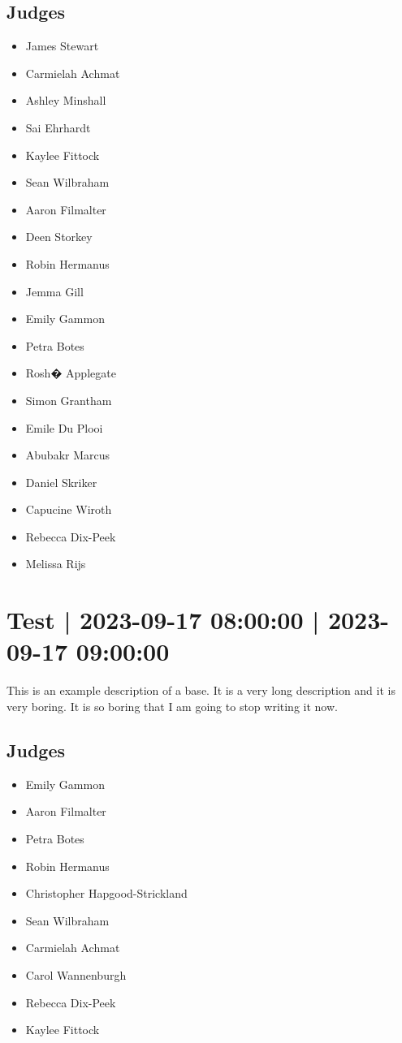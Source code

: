 \documentclass[10pt]{article}
\begin{document}
	\subsection*{Judges}
	\begin{itemize}

			\item James Stewart
			\item Carmielah Achmat
			\item Ashley Minshall
			\item Sai Ehrhardt
			\item Kaylee Fittock
			\item Sean Wilbraham
			\item Aaron Filmalter
			\item Deen Storkey
			\item Robin Hermanus
			\item Jemma Gill
			\item Emily Gammon
			\item Petra Botes
			\item Rosh� Applegate
			\item Simon Grantham
			\item Emile Du Plooi
			\item Abubakr Marcus
			\item Daniel Skriker
			\item Capucine Wiroth
			\item Rebecca Dix-Peek
			\item Melissa Rijs
		\end{itemize}

			\setcounter{section}{28}
	\section{Test | 2023-09-17 08:00:00 | 2023-09-17 09:00:00}
	This is an example description of a base. It is a very long description and it is very boring. It is so boring that I am going to stop writing it now.

	\subsection*{Judges}
	\begin{itemize}

			\item Emily Gammon
			\item Aaron Filmalter
			\item Petra Botes
			\item Robin Hermanus
			\item Christopher Hapgood-Strickland
			\item Sean Wilbraham
			\item Carmielah Achmat
			\item Carol Wannenburgh
			\item Rebecca Dix-Peek
			\item Kaylee Fittock
		\end{itemize}
\end{document}
